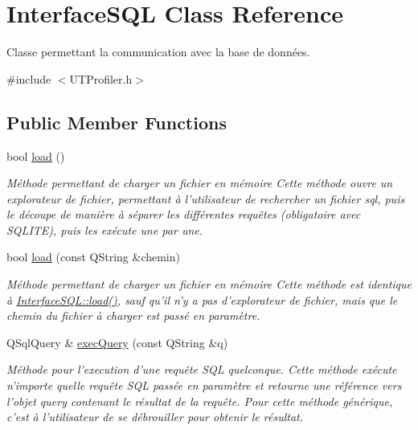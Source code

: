 \hypertarget{class_interface_s_q_l}{\section{Interface\-S\-Q\-L Class Reference}
\label{class_interface_s_q_l}
}


Classe permettant la communication avec la base de données.  




{\ttfamily \#include $<$U\-T\-Profiler.\-h$>$}

\subsection*{Public Member Functions}
\begin{DoxyCompactItemize}
\item 
bool \hyperlink{class_interface_s_q_l_af0f017feacae6ac3ca6f02199a1f4563}{load} ()
\begin{DoxyCompactList}\small\item\em Méthode permettant de charger un fichier en mémoire Cette méthode ouvre un explorateur de fichier, permettant à l'utilisateur de rechercher un fichier sql, puis le découpe de manière à séparer les différentes requêtes (obligatoire avec S\-Q\-L\-I\-T\-E), puis les exécute une par une. \end{DoxyCompactList}\item 
bool \hyperlink{class_interface_s_q_l_a9feeb19a1f58fad7a97c0a8b46cfa432}{load} (const Q\-String \&chemin)
\begin{DoxyCompactList}\small\item\em Méthode permettant de charger un fichier en mémoire Cette méthode est identique à \hyperlink{class_interface_s_q_l_af0f017feacae6ac3ca6f02199a1f4563}{Interface\-S\-Q\-L\-::load()}, sauf qu'il n'y a pas d'explorateur de fichier, mais que le chemin du fichier à charger est passé en paramètre. \end{DoxyCompactList}\item 
Q\-Sql\-Query \& \hyperlink{class_interface_s_q_l_a3cd459cd03bdb9cd74964e6ca0d49d96}{exec\-Query} (const Q\-String \&q)
\begin{DoxyCompactList}\small\item\em Méthode pour l'execution d'une requête S\-Q\-L quelconque. Cette méthode exécute n'importe quelle requête S\-Q\-L passée en paramètre et retourne une référence vers l'objet query contenant le résultat de la requête. Pour cette méthode générique, c'est à l'utilisateur de se débrouiller pour obtenir le résultat. \end{DoxyCompactList}\item 

\end{DoxyCompactItemize}
